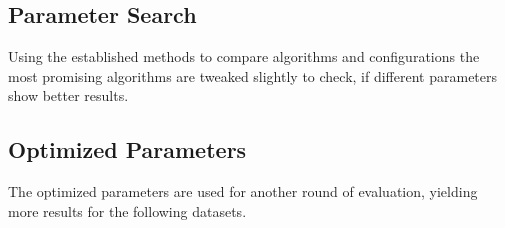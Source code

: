 \subsection{Parameter Search}

Using the established methods to compare algorithms and configurations the most promising algorithms are tweaked slightly to check, if different parameters show better results.

\subsection{Optimized Parameters}

The optimized parameters are used for another round of evaluation, yielding more results for the following datasets.
